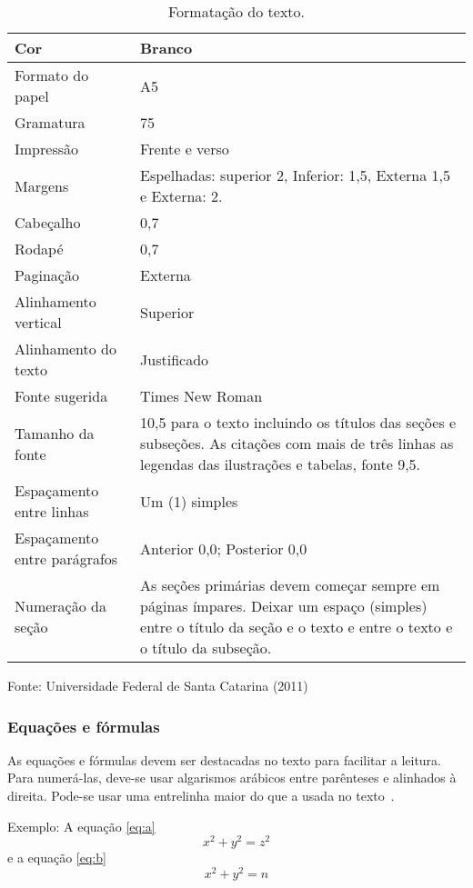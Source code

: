 \documentclass{ufscThesis} %
\begin{document}
\begin{table}[!htb]
\begin{center}
    \caption{Formatação do texto.}\label{tab:a}
  \begin{tabular}{ p{3cm} | p{6cm} }
    \hline
Cor & Branco\\ \hline
Formato do papel & A5\\ \hline
Gramatura & 75\\ \hline
Impressão & Frente e verso\\ \hline
Margens & Espelhadas: superior 2, Inferior: 1,5, Externa 1,5 e Externa: 2.\\ \hline
Cabeçalho & 0,7\\ \hline
Rodapé & 0,7\\ \hline
Paginação & Externa\\ \hline
Alinhamento vertical & Superior\\ \hline
Alinhamento do texto & Justificado\\ \hline
Fonte sugerida & Times New Roman \\ \hline
Tamanho da fonte & 10,5 para o texto incluindo os títulos das seções e subseções. As citações com mais de três linhas as legendas das ilustrações e tabelas, fonte 9,5.\\ \hline
Espaçamento entre linhas & Um (1) simples\\ \hline
Espaçamento entre parágrafos & Anterior 0,0; Posterior 0,0\\ \hline
Numeração da seção & As seções  primárias devem  começar  sempre em páginas ímpares. Deixar um espaço (simples) entre o título da seção e o texto e  entre o texto e o título da subseção. \\  \hline
  \end{tabular}
\end{center}
Fonte: Universidade Federal de Santa Catarina (2011)
\end{table}



\subsubsection{Equações e fórmulas}

As equações e fórmulas devem ser destacadas no texto para facilitar a leitura.  Para numerá-las, deve-se usar algarismos arábicos entre parênteses e alinhados à direita. Pode-se usar uma entrelinha maior do que a usada no texto~\cite{abnt14724}.

Exemplo: A equação \ref{eq:a}
\begin{equation}
 x^2 + y^2 = z^2
 \label{eq:a}
\end{equation}
 e a equação  \ref{eq:b}
\begin{equation}
 x^2 + y^2 = n
\label{eq:b}
\end{equation}
\end{document}
